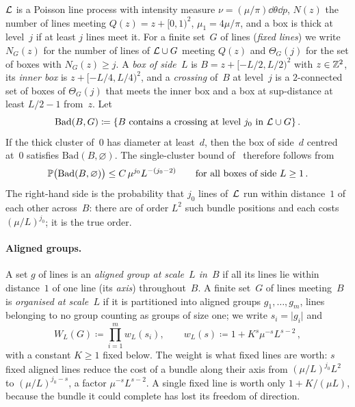 \documentclass[11pt,letterpaper]{article}
\newcommand{\Bad}{\mathrm{Bad}}
\begin{document}
$\mathcal L$ is a Poisson line process with intensity measure $\nu=(\mu/\pi)\dd\theta\dd p$, $N(z)$ the number of lines meeting $Q(z)=z+[0,1)^2$, $\mu_1=4\mu/\pi$, and a box is thick at level~$j$ if at least $j$ lines meet it. For a finite set~$G$ of lines (\emph{fixed lines}) we write $N_G(z)$ for the number of lines of $\mathcal L\cup G$ meeting $Q(z)$ and $\Theta_G(j)$ for the set of boxes with $N_G(z)\ge j$. A \emph{box of side~$L$} is $B=z+[-L/2,L/2)^2$ with $z\in\mathbb Z^2$, its \emph{inner box} is $z+[-L/4,L/4)^2$, and a \emph{crossing} of~$B$ at level~$j$ is a $2$-connected set of boxes of $\Theta_G(j)$ that meets the inner box and a box at sup-distance at least $L/2-1$ from~$z$. Let
\begin{equation*}
  \Bad(B,G)\coloneqq\{B\text{ contains a crossing at level }j_0\text{ in }\cL\cup G\}\,.
\end{equation*}
If the thick cluster of~$0$ has diameter at least~$d$, then the box of side~$d$ centred at~$0$ satisfies $\Bad(B,\varnothing)$. The single-cluster bound of~\cite{FM26} therefore follows from
\begin{equation}
\label{eq:goal}
  \P\bigl(\Bad(B,\varnothing)\bigr)\le C\,\mu^{j_0}L^{-(j_0-2)}\qquad\text{for all boxes of side }L\ge1\,.
\end{equation}
The right-hand side is the probability that $j_0$ lines of~$\mathcal L$ run within distance~$1$ of each other across~$B$: there are of order $L^2$ such bundle positions and each costs $(\mu/L)^{j_0}$; it is the true order.

\paragraph{Aligned groups.} A set $g$ of lines is an \emph{aligned group at scale~$L$ in~$B$} if all its lines lie within distance~$1$ of one line (its \emph{axis}) throughout~$B$. A finite set~$G$ of lines meeting~$B$ is \emph{organised at scale~$L$} if it is partitioned into aligned groups $g_1,\dots,g_m$, lines belonging to no group counting as groups of size one; we write $s_i=\lvert g_i\rvert$ and
\begin{equation}
\label{eq:weight}
  W_L(G)\coloneqq\prod_{i=1}^m w_L(s_i),\qquad w_L(s)\coloneqq1+K^s\mu^{-s}L^{s-2}\,,
\end{equation}
with a constant $K\ge1$ fixed below. The weight is what fixed lines are worth: $s$ fixed aligned lines reduce the cost of a bundle along their axis from $(\mu/L)^{j_0}L^2$ to $(\mu/L)^{j_0-s}$, a factor $\mu^{-s}L^{s-2}$. A single fixed line is worth only $1+K/(\mu L)$, because the bundle it could complete has lost its freedom of direction.
\end{document}
